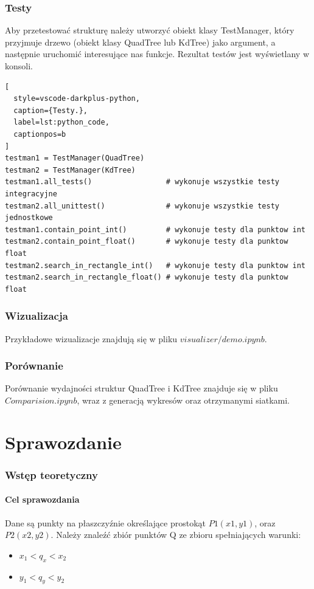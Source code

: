 \documentclass{lab}
\begin{document}
\section{Testy}
Aby przetestować strukturę należy utworzyć obiekt klasy TestManager, który przyjmuje drzewo (obiekt klasy QuadTree lub KdTree) jako argument, a następnie uruchomić interesujące nas funkcje. Rezultat testów jest wyświetlany w konsoli.
\begin{lstlisting}[
  style=vscode-darkplus-python,
  caption={Testy.},
  label=lst:python_code,
  captionpos=b
]
testman1 = TestManager(QuadTree)
testman2 = TestManager(KdTree)
testman1.all_tests()                 # wykonuje wszystkie testy integracyjne
testman2.all_unittest()              # wykonuje wszystkie testy jednostkowe
testman1.contain_point_int()         # wykonuje testy dla punktow int
testman2.contain_point_float()       # wykonuje testy dla punktow float
testman2.search_in_rectangle_int()   # wykonuje testy dla punktow int
testman2.search_in_rectangle_float() # wykonuje testy dla punktow float
\end{lstlisting}

\section{Wizualizacja}
Przykładowe wizualizacje znajdują się w pliku $visualizer/demo.ipynb$.

\section{Porównanie}
Porównanie wydajności struktur QuadTree i KdTree znajduje się w pliku $Comparision.ipynb$, wraz z generacją wykresów oraz otrzymanymi siatkami.

\newpage
\part{Sprawozdanie}
\section{Wstęp teoretyczny}
\subsection{Cel sprawozdania}
Dane są punkty na płaszczyźnie określające prostokąt $P1(x1,y1)$, oraz $P2(x2,y2)$. Należy znaleźć zbiór punktów Q ze zbioru spełniających warunki:
\begin{itemize}
    \item $x_1 < q_x < x_2$
    \item $y_1 < q_y < y_2$
\end{itemize}
\end{document}
